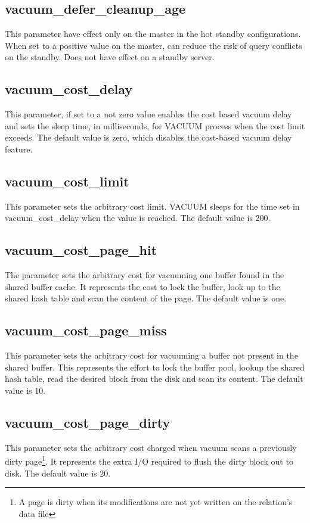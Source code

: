 \subsection{vacuum\_defer\_cleanup\_age}
This parameter have effect only on the master in the hot standby configurations. When set to a positive  
value on the master, can reduce the risk of query conflicts on the standby. Does not have effect on a 
standby server.

\subsection{vacuum\_cost\_delay}\label{sub:VACUUMCOST}
This parameter, if set to a not zero value enables the cost based vacuum delay and sets the sleep time, in milliseconds, for VACUUM process when the cost limit exceeds. The 
default value is zero, which disables the cost-based vacuum delay feature. 

\subsection{vacuum\_cost\_limit}
This parameter sets the arbitrary cost limit. VACUUM sleeps for the time set in vacuum\_cost\_delay when 
the value is reached. The default value is 200. 

\subsection{vacuum\_cost\_page\_hit}
The parameter sets the arbitrary cost for vacuuming one buffer found in the shared buffer cache. It 
represents the cost to lock the buffer, look up to the shared hash table and scan the content of the page. 
The default value is one.

\subsection{vacuum\_cost\_page\_miss}
This parameter sets the arbitrary cost for vacuuming a buffer not present in the shared buffer. This 
represents the effort to lock the buffer pool, lookup the shared hash table, read the desired block 
from the disk and scan its content. The default value is 10.

\subsection{vacuum\_cost\_page\_dirty}
This parameter sets the arbitrary cost charged when vacuum scans a previously dirty page\footnote{A 
page is dirty when its modifications are not yet written on the relation's data file}. It represents the 
extra I/O required to flush the dirty block out to disk. The default value is 20.

